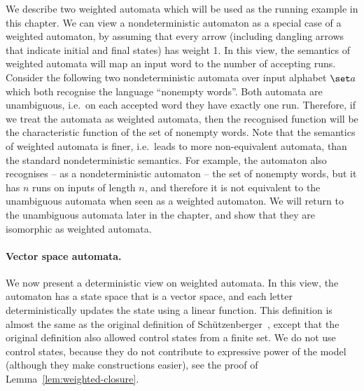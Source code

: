 \begin{example} \label{ex:run-wei-one} We describe two weighted automata which will be used as the running example in this chapter.
We can view a nondeterministic automaton  as a special case of a weighted automaton, by assuming that every arrow (including dangling arrows that indicate initial and final states) has weight 1. In this   view,  the  semantics of weighted automata will map an input word  to  the number of accepting runs. 
	Consider the following two nondeterministic automata over input alphabet $\set a$
	 which both recognise the language ``nonempty words''. Both automata are unambiguous, i.e.~on each accepted word they have exactly one run. Therefore, if we treat the automata  as weighted automata, then the recognised  function will  be the characteristic function of the set of nonempty words. Note that the semantics of weighted automata is finer, i.e.~leads to more non-equivalent automata, than the standard nondeterministic semantics. For example, the automaton
	 also recognises -- as a nondeterministic automaton -- the set of nonempty words, but it has $n$ runs on inputs of length $n$, and therefore it is not equivalent to the unambiguous  automata when seen as a weighted automaton.  We will return to the unambiguous  automata later in the chapter, and show that they are isomorphic as weighted automata.
\end{example}

\paragraph*{Vector space automata.} We now present a deterministic view on weighted automata. In this view, the automaton has a  state space that is a vector space, and each letter deterministically updates the state using a linear function. This definition is almost the same as  the original definition of Schützenberger~\cite[Definition 1]{Schutzenberger:1961cf}, except that the original definition also allowed control states from a finite set. We do not use control states, because they do  not contribute to expressive power of the model (although they make constructions easier), see the proof of Lemma~\ref{lem:weighted-closure}.




